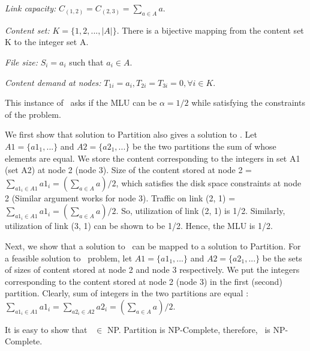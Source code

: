{\vsp

\noindent\emph{Link capacity:}  $C_{(1, 2)} = C_{(2, 3)} = \sum_{a \in A} a$.

\vsp

\noindent\emph{Content set:}  $K = \{1, 2, ..., |A|\} $. There is a bijective mapping from the content set K to the integer set A.

\vsp

\noindent\emph{File size:}  $S_{i} = a_i$  such that $ a_i \in A$.

\vsp

\noindent\emph{Content demand at nodes:}  $T_{1i} = a_i, T_{2i} = T_{3i} = 0,  \forall i \in K$.


This instance of \optloc\ asks if the MLU can be $\alpha = 1/2$ while satisfying the constraints of the problem. 

We first show that solution to Partition also gives a solution to \optloc. Let $A1 = \{a1_1, ... \}$ and  $A2 = \{a2_1, ... \}$ be the two partitions the sum of whose elements are equal.  We store the content corresponding to the integers in set A1 (set A2) at node  2 (node 3). Size of the content stored at node 2 = $\sum_{a1_i \in A1} a1_i =  (\sum_{a \in A} a)/2$, which satisfies the disk space constraints at node 2  (Similar argument works for node 3). Traffic on link (2, 1) = $\sum_{a1_i \in A1} a1_i =  (\sum_{a \in A} a)/2$. So, utilization of link (2, 1) is 1/2.  Similarly, utilization of link (3, 1) can be shown to be 1/2. Hence, the MLU is 1/2.


Next, we show that a solution to \optloc\ can be mapped to a solution to Partition. For a feasible solution to \optloc\ problem, let $A1 = \{a1_1, ... \}$ and  $A2 = \{a2_1, ... \}$ be the sets of sizes of content stored at node 2 and node 3 respectively. We put the integers corresponding to the content stored at node 2 (node 3) in the first (second) partition. Clearly, sum of integers in the two partitions are equal : $\sum_{a1_i \in A1} a1_i   = \sum_{a2_i \in A2} a2_i = (\sum_{a \in A} a)/2$.

It is easy to show that \optloc\ $\in$ NP. Partition is NP-Complete, therefore, \optloc\ is  NP-Complete. 

}


